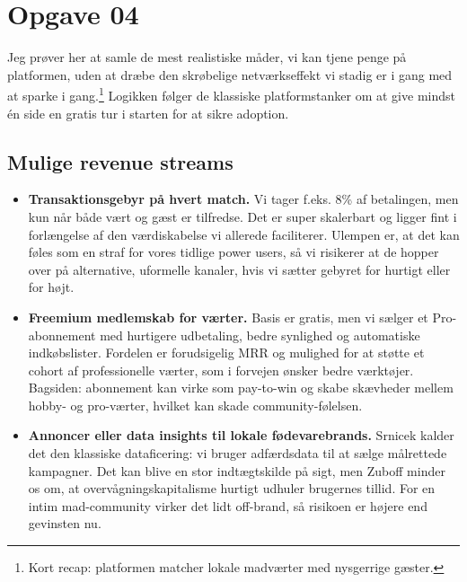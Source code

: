 \section*{Opgave 04}

Jeg prøver her at samle de mest realistiske måder, vi kan tjene penge på platformen, uden at dræbe den skrøbelige netværkseffekt vi stadig er i gang med at sparke i gang.\footnote{Kort recap: platformen matcher lokale madværter med nysgerrige gæster.} Logikken følger de klassiske platformstanker om at give mindst én side en gratis tur i starten for at sikre adoption.\citep{Choudary2016}

\subsection*{Mulige revenue streams}
\begin{itemize}
  \item \textbf{Transaktionsgebyr på hvert match.} Vi tager f.eks. 8\% af betalingen, men kun når både vært og gæst er tilfredse. Det er super skalerbart og ligger fint i forlængelse af den værdiskabelse vi allerede faciliterer.\citep{HagiuWright2013} Ulempen er, at det kan føles som en straf for vores tidlige power users, så vi risikerer at de hopper over på alternative, uformelle kanaler, hvis vi sætter gebyret for hurtigt eller for højt.\citep{Reillier2017}
  \item \textbf{Freemium medlemskab for værter.} Basis er gratis, men vi sælger et Pro-abonnement med hurtigere udbetaling, bedre synlighed og automatiske indkøbslister. Fordelen er forudsigelig MRR og mulighed for at støtte et cohort af professionelle værter, som i forvejen ønsker bedre værktøjer.\citep{Choudary2016} Bagsiden: abonnement kan virke som pay-to-win og skabe skævheder mellem hobby- og pro-værter, hvilket kan skade community-følelsen.
  \item \textbf{Annoncer eller data insights til lokale fødevarebrands.} Srnicek kalder det den klassiske dataficering: vi bruger adfærdsdata til at sælge målrettede kampagner.\citep{Srnicek2017} Det kan blive en stor indtægtskilde på sigt, men Zuboff minder os om, at overvågningskapitalisme hurtigt udhuler brugernes tillid.\citep{Zuboff2019} For en intim mad-community virker det lidt off-brand, så risikoen er højere end gevinsten nu.
\end{itemize}


